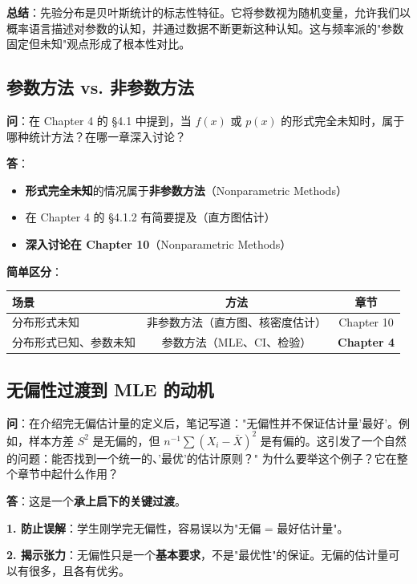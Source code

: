 \textbf{总结}：先验分布是贝叶斯统计的标志性特征。它将参数视为随机变量，允许我们以概率语言描述对参数的认知，并通过数据不断更新这种认知。这与频率派的"参数固定但未知"观点形成了根本性对比。

\subsection{参数方法 vs. 非参数方法}\label{sec:qa-parametric-vs-nonparametric}

\textbf{问}：在 Chapter 4 的 §4.1 中提到，当 $f(x)$ 或 $p(x)$ 的形式完全未知时，属于哪种统计方法？在哪一章深入讨论？

\textbf{答}：
\begin{itemize}
\item \textbf{形式完全未知}的情况属于\textbf{非参数方法}（Nonparametric Methods）
\item 在 Chapter 4 的 §4.1.2 有简要提及（直方图估计）
\item \textbf{深入讨论在 Chapter 10}（Nonparametric Methods）
\end{itemize}

\textbf{简单区分}：
\begin{center}
\begin{tabular}{lcc}
\hline
场景 & 方法 & 章节 \\
\hline
分布形式未知 & 非参数方法（直方图、核密度估计） & Chapter 10 \\
分布形式已知、参数未知 & 参数方法（MLE、CI、检验） & \textbf{Chapter 4} \\
\hline
\end{tabular}
\end{center}

\subsection{无偏性过渡到 MLE 的动机}\label{sec:qa-unbiasedness-transition}

\textbf{问}：在介绍完无偏估计量的定义后，笔记写道："无偏性并不保证估计量'最好'。例如，样本方差 $S^2$ 是无偏的，但 $n^{-1}\sum(X_i - \bar{X})^2$ 是有偏的。这引发了一个自然的问题：能否找到一个统一的、'最优'的估计原则？" 为什么要举这个例子？它在整个章节中起什么作用？

\textbf{答}：这是一个\textbf{承上启下的关键过渡}。

\textbf{1. 防止误解}：学生刚学完无偏性，容易误以为"无偏 = 最好估计量"。

\textbf{2. 揭示张力}：无偏性只是一个\textbf{基本要求}，不是"最优性"的保证。无偏的估计量可以有很多，且各有优劣。

